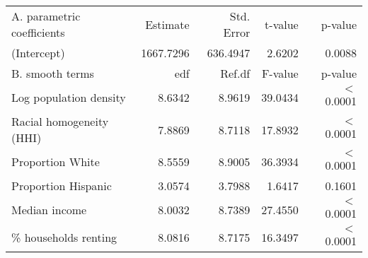 \begin{table}[ht]
\centering
\begin{tabular}{lrrrr}
   \hline
A. parametric coefficients & Estimate & Std. Error & t-value & p-value \\ 
  (Intercept) & 1667.7296 & 636.4947 & 2.6202 & 0.0088 \\ 
   \hline
B. smooth terms & edf & Ref.df & F-value & p-value \\ 
  Log population density & 8.6342 & 8.9619 & 39.0434 & $<$ 0.0001 \\ 
  Racial homogeneity (HHI) & 7.8869 & 8.7118 & 17.8932 & $<$ 0.0001 \\ 
  Proportion White & 8.5559 & 8.9005 & 36.3934 & $<$ 0.0001 \\ 
  Proportion Hispanic & 3.0574 & 3.7988 & 1.6417 & 0.1601 \\ 
  Median income & 8.0032 & 8.7389 & 27.4550 & $<$ 0.0001 \\ 
  \% households renting & 8.0816 & 8.7175 & 16.3497 & $<$ 0.0001 \\ 
   \hline
\end{tabular}
\caption{ } 
\label{Demographic GAM}
\end{table}
